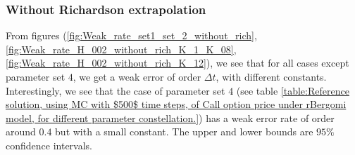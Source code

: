 \FloatBarrier


\subsubsection{Without Richardson extrapolation}
From figures (\ref{fig:Weak_rate_set1_set_2_without_rich},\ref{fig:Weak_rate_H_002_without_rich_K_1_K_08},\ref{fig:Weak_rate_H_002_without_rich_K_12}), we see that for all cases  except parameter set $4$, we get a weak error of order $\Delta t$, with different  constants. Interestingly, we see that the case of parameter set $4$ (see table \ref{table:Reference solution, using MC with $500$ time steps, of Call option price under rBergomi model, for different parameter constellation.}) has a weak error rate of order around $0.4$ but with a small constant. The upper and lower bounds are $95\%$ confidence intervals.

